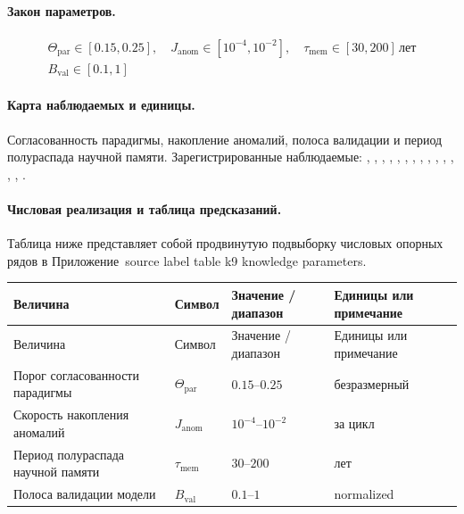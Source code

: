 \paragraph{Закон параметров.}
\[
\begin{gathered} \Theta_{\mathrm{par}} \in [0.15,0.25],\quad J_{\mathrm{anom}} \in [10^{-4},10^{-2}],\quad \tau_{\mathrm{mem}} \in [30,200]\,\mathrm{лет} \\ B_{\mathrm{val}} \in [0.1,1] \end{gathered}
\]

\paragraph{Карта наблюдаемых и единицы.}
Согласованность парадигмы, накопление аномалий, полоса валидации и период полураспада научной памяти.
Зарегистрированные наблюдаемые: , \allowbreak {}, \allowbreak {}, \allowbreak {}, \allowbreak {}, \allowbreak {}, \allowbreak {}, \allowbreak {}, \allowbreak {}, \allowbreak {}, \allowbreak {}, \allowbreak {}, \allowbreak {}, \allowbreak {}, \allowbreak {}.

\paragraph{Числовая реализация и таблица предсказаний.}
Таблица ниже представляет собой продвинутую подвыборку числовых опорных рядов в Приложение~source label table k9 knowledge parameters.
\begin{longtable}{@{}L{0.27\textwidth}L{0.15\textwidth}L{0.24\textwidth}L{0.16\textwidth}@{}}
\toprule
Величина & Символ & Значение / диапазон & Единицы или примечание \\
\midrule
\endfirsthead
\toprule
Величина & Символ & Значение / диапазон & Единицы или примечание \\
\midrule
\endhead
Порог согласованности парадигмы & $\scriptstyle \Theta_{\mathrm{par}}$ & $0.15\text{--}0.25$ & безразмерный \\
Скорость накопления аномалий & $\scriptstyle J_{\mathrm{anom}}$ & $10^{-4}\text{--}10^{-2}$ & за цикл \\
Период полураспада научной памяти & $\scriptstyle \tau_{\mathrm{mem}}$ & $30\text{--}200$ & лет \\
Полоса валидации модели & $\scriptstyle B_{\mathrm{val}}$ & $0.1\text{--}1$ & normalized \\
\bottomrule
\end{longtable}

